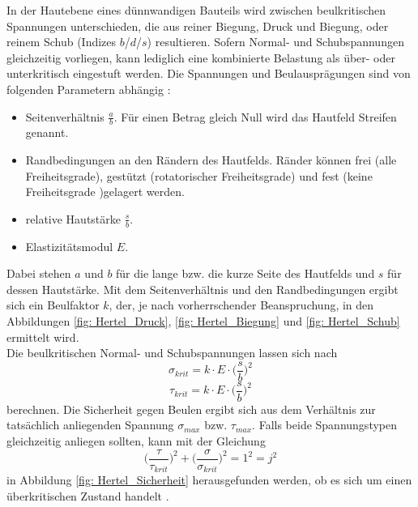 \noindent In der Hautebene eines dünnwandigen Bauteils wird zwischen beulkritischen Spannungen unterschieden, die aus reiner Biegung, Druck und Biegung, oder reinem Schub (Indizes $b$/$d$/$s$) resultieren. Sofern Normal- und Schubspannungen gleichzeitig vorliegen, kann lediglich eine kombinierte Belastung als über- oder unterkritisch eingestuft werden. Die Spannungen und Beulausprägungen sind von folgenden Parametern abhängig \cite{item1}:
\begin{itemize}
	\item Seitenverhältnis $\frac{a}{b}$. Für einen Betrag gleich Null wird das Hautfeld \glqq Streifen\grqq\: genannt. 
	\item Randbedingungen an den Rändern des Hautfelds. Ränder können frei (alle Freiheitsgrade), gestützt (rotatorischer Freiheitsgrade) und fest (keine Freiheitsgrade )gelagert werden.
	\item relative Hautstärke $\frac{s}{b}$.
	\item Elastizitätsmodul $E$.
\end{itemize}
Dabei stehen $a$ und $b$ für die lange bzw. die kurze Seite des Hautfelds und $s$ für dessen Hautstärke. Mit dem Seitenverhältnis und den Randbedingungen ergibt sich ein Beulfaktor $k$, der, je nach vorherrschender Beanspruchung, in den Abbildungen \ref{fig: Hertel_Druck}, \ref{fig: Hertel_Biegung} und \ref{fig: Hertel_Schub}  ermittelt wird. \\
Die beulkritischen Normal- und Schubspannungen lassen sich nach
\begin{equation}
	\sigma_{krit}=k\cdot E\cdot\Big(\frac{s}{b}\Big)^{2}
\end{equation}
\begin{equation}
	\tau_{krit}=k\cdot E\cdot\Big(\frac{s}{b}\Big)^{2}
\end{equation}
berechnen. Die Sicherheit gegen Beulen ergibt sich aus dem Verhältnis zur tatsächlich anliegenden Spannung $\sigma_{max}$ bzw. $\tau_{max}$. Falls beide Spannungstypen gleichzeitig anliegen sollten, kann mit der Gleichung
\begin{equation}
	\Big(\frac{\tau}{\tau_{krit}}\Big)^{2}+\Big(\frac{\sigma}{\sigma_{krit}}\Big)^{2}=1^{2}=j^{2}
\end{equation}
in Abbildung \ref{fig: Hertel_Sicherheit} herausgefunden werden, ob es sich um einen überkritischen Zustand handelt \cite{item1}.\\

